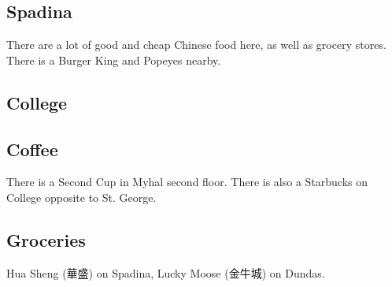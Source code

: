 \subsection{Spadina}

There are a lot of good and cheap Chinese food here, as well as grocery stores. There is a Burger King and Popeyes nearby.

\subsection{College}


\subsection{Coffee}

There is a Second Cup in Myhal second floor. There is also a Starbucks on College opposite to St. George.

\subsection{Groceries}

Hua Sheng (華盛) on Spadina, Lucky Moose (金牛城) on Dundas.
